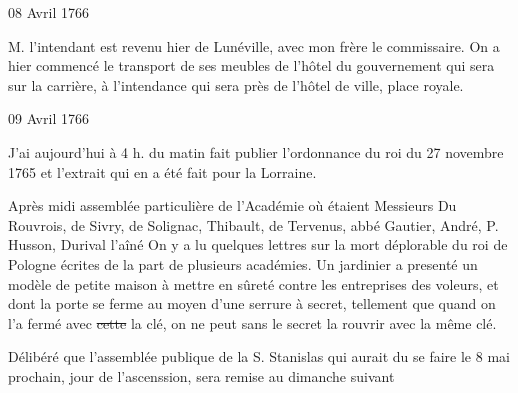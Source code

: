                      \begin{diary}{08 Avril 1766}{}


                           M. l'intendant est revenu hier de
                              Lunéville, avec
                           mon frère le commissaire. On a hier commencé
                           le transport de ses meubles de l'hôtel du gouvernement
                           qui sera sur la carrière, à l'intendance
                           qui sera
                           près de l'hôtel de
                              ville,
                              place royale.
                        \bigskip


                     \end{diary}

                     \begin{diary}{09 Avril 1766}{}

                         J'ai aujourd'hui à 4 h. du matin fait
                           publier l'ordonnance du roi du 27 novembre 1765
                           et l'extrait qui en a été fait pour la
                              Lorraine. \bigskip


                         Après midi assemblée particulière de
                              l'Académie
                           où étaient Messieurs
                           Du Rouvrois, de Sivry, de
                              Solignac, Thibault, de
                           Tervenus, abbé
                              Gautier, André,
                              P. Husson, Durival l'aîné
                           On y a lu quelques lettres sur la mort
                           déplorable du roi de Pologne écrites de la part
                           de plusieurs  académies. Un jardinier a presenté
                           un modèle de petite maison à mettre en sûreté
                           contre les entreprises des voleurs, et dont la porte se ferme au moyen d'une serrure à
                           secret, tellement que quand on l'a fermé avec
                           \sout{cette} la clé, on ne peut sans le
                           secret la
                           rouvrir avec la même clé. \bigskip


                         Délibéré que l'assemblée publique de la
                           S. Stanislas qui aurait du se faire le
                           8 mai prochain, jour de l'ascenssion,
                           sera
                           remise au dimanche suivant \bigskip


                     \end{diary}

